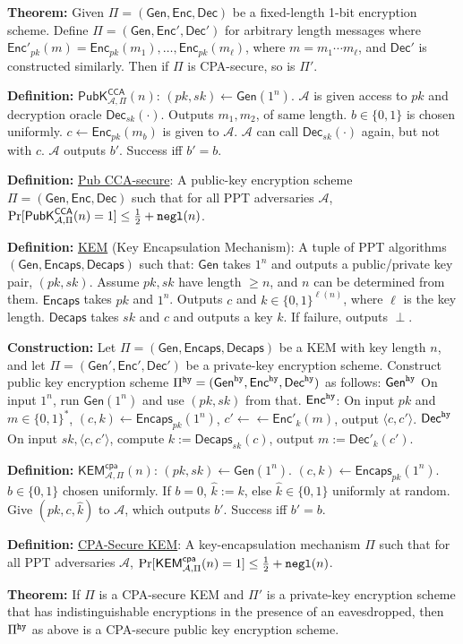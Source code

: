 \documentclass[10pt]{article}
\newcommand{\AAA}{\mathcal{A}}
\newcommand{\defn}[1]{{\bf Definition:} \underline{#1}}
\newcommand{\thm}[1]{{\bf Theorem:} \underline{#1}}
\newcommand{\con}[1]{{\bf Construction:} \underline{#1}}
\newcommand{\Enc}{\mathsf{Enc}}
\newcommand{\Dec}{\mathsf{Dec}}
\newcommand{\Encaps}{\mathsf{Encaps}}
\newcommand{\Decaps}{\mathsf{Decaps}}
\newcommand{\Gen}{\mathsf{Gen}}
\newcommand{\ang}[1]{\langle#1\rangle}
\newcommand{\GenEncDec}{(\Gen,\Enc,\Dec)}
\newcommand{\GenEncapsDecaps}{(\Gen,\Encaps,\Decaps)}
\newcommand{\ExptPubCcaArgs}[2]{\mathsf{PubK}^{\mathsf{CCA}}_{#1,#2}}
\newcommand{\ExptKemCpa}{\mathsf{KEM}^{\mathsf{cpa}}_{\AAA,\Pi}}
\newcommand{\ExptPubCca}{\ExptPubCcaArgs{\AAA}{\Pi}}
\newcommand{\negl}{{\tt negl}}
\newcommand{\hy}{{\tt hy}}
\newcommand{\from}{\leftarrow}
\begin{document}
\begin{multicols}{3}
\thm{}Given $\Pi=\GenEncDec$ be a fixed-length 1-bit encryption scheme. Define $\Pi=(\Gen,\Enc',\Dec')$ for arbitrary length messages where $\Enc'_{pk}(m)=\Enc_{pk}(m_1),\dots,\Enc_{pk}(m_\ell)$, where $m=m_1\cdots m_\ell$, and $\Dec'$ is constructed similarly. Then if $\Pi$ is CPA-secure, so is $\Pi'$.

\defn{$\ExptPubCca(n)$}: $(pk,sk)\from\Gen(1^n)$. $\AAA$ is given access to $pk$ and decryption oracle $\Dec_{sk}(\cdot)$. Outputs $m_1,m_2$, of same length. $b\in\{0,1\}$ is chosen uniformly. $c\from\Enc_{pk}(m_b)$ is given to $\AAA$. $\AAA$ can call $\Dec_{sk}(\cdot)$ again, but not with $c$. $\AAA$ outputs $b'$. Success iff $b'=b$.

\defn{Pub CCA-secure}: A public-key encryption scheme $\Pi=\GenEncDec$ such that for all PPT adversaries $\AAA$, $\Pr[\ExptPubCca(n)=1]\leq\frac{1}{2}+\negl(n)$.

\defn{KEM} (Key Encapsulation Mechanism): A tuple of PPT algorithms $\GenEncapsDecaps$ such that: $\Gen$ takes $1^n$ and outputs a public/private key pair, $(pk,sk)$. Assume $pk,sk$ have length $\geq n$, and $n$ can be determined from them. $\Encaps$ takes $pk$ and $1^n$. Outputs $c$ and $k\in\{0,1\}^{\ell(n)}$, where $\ell$ is the key length. $\Decaps$ takes $sk$ and $c$ and outputs a key $k$. If failure, outputs $\perp$.

\con{}Let $\Pi=\GenEncapsDecaps$ be a KEM with key length $n$, and let $\Pi=(\Gen',\Enc',\Dec')$ be a private-key encryption scheme. Construct public key encryption scheme $\Pi^{\hy}=(\Gen^\hy,\Enc^\hy,\Dec^\hy)$ as follows: $\Gen^\hy$ On input $1^n$, run $\Gen(1^n)$ and use $(pk,sk)$ from that. $\Enc^\hy$: On input $pk$ and $m\in\{0,1\}^*$, $(c,k)\from\Encaps_{pk}(1^n)$, $c'\from\from\Enc'_k(m)$, output $\ang{c,c'}$. $\Dec^\hy$ On input $sk,\ang{c,c'}$, compute $k:=\Decaps_{sk}(c)$, output $m:=\Dec'_k(c')$.

\defn{$\ExptKemCpa(n)$}: $(pk,sk)\from\Gen(1^n)$. $(c,k)\from\Encaps_{pk}(1^n)$. $b\in\{0,1\}$ chosen uniformly. If $b=0$, $\hat{k}:=k$, else $\hat{k}\in\{0,1\}$ uniformly at random. Give $(pk,c,\hat{k})$ to $\AAA$, which outputs $b'$. Success iff $b'=b$.

\defn{CPA-Secure KEM}: A key-encapsulation mechanism $\Pi$ such that for all PPT adversaries $\AAA$, $\Pr[\ExptKemCpa(n)=1]\leq\frac{1}{2}+\negl(n)$.

\thm{}If $\Pi$ is a CPA-secure KEM and $\Pi'$ is a private-key encryption scheme that has indistinguishable encryptions in the presence of an eavesdropped, then $\Pi^\hy$ as above is a CPA-secure public key encryption scheme.


\end{multicols}
\end{document}
